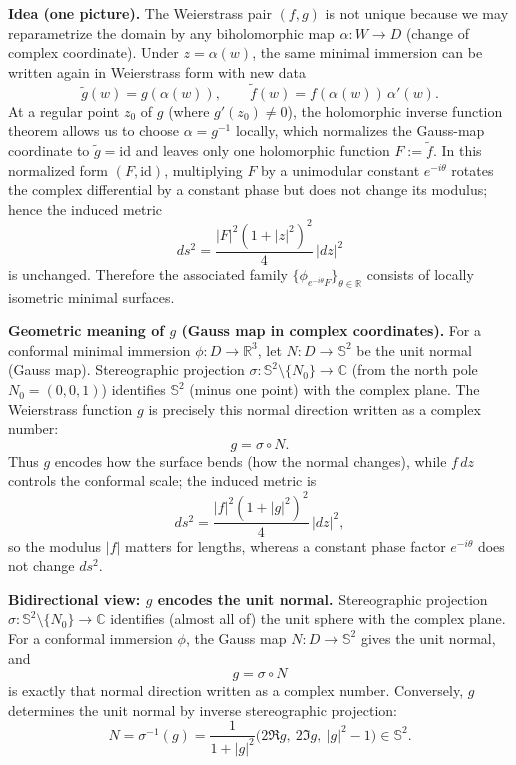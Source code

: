 \begin{problem}[CP-IV-0089]
	\medskip
	\noindent
	\textbf{Idea (one picture).}
	The Weierstrass pair $(f,g)$ is not unique because we may reparametrize the domain by any biholomorphic map
	$\alpha:W\to D$ (change of complex coordinate). Under $z=\alpha(w)$, the same minimal immersion can be written again in
	Weierstrass form with new data
	\[
	\tilde g(w)=g(\alpha(w)),\qquad \tilde f(w)=f(\alpha(w))\,\alpha'(w).
	\]
	At a regular point $z_0$ of $g$ (where $g'(z_0)\neq 0$), the holomorphic inverse function theorem allows us to choose
	$\alpha=g^{-1}$ locally, which normalizes the Gauss-map coordinate to $\tilde g=\mathrm{id}$ and leaves only one holomorphic
	function $F:=\tilde f$. In this normalized form $(F,\mathrm{id})$, multiplying $F$ by a unimodular constant
	$e^{-i\theta}$ rotates the complex differential by a constant phase but does not change its modulus; hence the induced metric
	\[
	ds^2=\frac{|F|^2(1+|z|^2)^2}{4}\,|dz|^2
	\]
	is unchanged. Therefore the associated family $\{\phi_{e^{-i\theta}F}\}_{\theta\in\mathbb R}$ consists of locally isometric
	minimal surfaces.
	\medskip

	\medskip
	\noindent
	\textbf{Geometric meaning of $g$ (Gauss map in complex coordinates).}
	For a conformal minimal immersion $\phi:D\to\mathbb R^3$, let $N:D\to\mathbb S^2$ be the unit normal (Gauss map).
	Stereographic projection $\sigma:\mathbb S^2\setminus\{N_0\}\to\mathbb C$ (from the north pole $N_0=(0,0,1)$) identifies
	$\mathbb S^2$ (minus one point) with the complex plane. The Weierstrass function $g$ is precisely this normal direction
	written as a complex number:
	\[
	g=\sigma\circ N.
	\]
	Thus $g$ encodes how the surface bends (how the normal changes), while $f\,dz$ controls the conformal scale; the induced
	metric is
	\[
	ds^2=\frac{|f|^2(1+|g|^2)^2}{4}\,|dz|^2,
	\]
	so the modulus $|f|$ matters for lengths, whereas a constant phase factor $e^{-i\theta}$ does not change $ds^2$.
	\medskip

	\medskip
	\noindent
	\textbf{Bidirectional view: $g$ encodes the unit normal.}
	Stereographic projection $\sigma:\mathbb S^2\setminus\{N_0\}\to\mathbb C$ identifies (almost all of) the unit sphere with
	the complex plane. For a conformal immersion $\phi$, the Gauss map $N:D\to\mathbb S^2$ gives the unit normal, and
	\[
	g=\sigma\circ N
	\]
	is exactly that normal direction written as a complex number. Conversely, $g$ determines the unit normal by inverse
	stereographic projection:
	\[
	N=\sigma^{-1}(g)=\frac{1}{1+|g|^2}\bigl(2\Re g,\ 2\Im g,\ |g|^2-1\bigr)\in\mathbb S^2.
	\]
	\medskip

	\clearpage
\end{problem}

